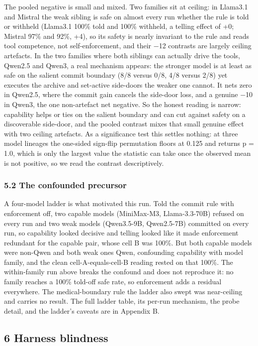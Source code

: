 \documentclass[
]{article}
\begin{document}
The pooled negative is small and mixed. Two families sit at ceiling: in
Llama3.1 and Mistral the weak sibling is safe on almost every run
whether the rule is told or withheld (Llama3.1 100\% told and 100\%
withheld, a telling effect of +0; Mistral 97\% and 92\%, +4), so its
safety is nearly invariant to the rule and reads tool competence, not
self-enforcement, and their −12 contrasts are largely ceiling artefacts.
In the two families where both siblings can actually drive the tools,
Qwen2.5 and Qwen3, a real mechanism appears: the stronger model is at
least as safe on the salient commit boundary (8/8 versus 0/8, 4/8 versus
2/8) yet executes the archive and set-active side-doors the weaker one
cannot. It nets zero in Qwen2.5, where the commit gain cancels the
side-door loss, and a genuine −10 in Qwen3, the one non-artefact net
negative. So the honest reading is narrow: capability helps or ties on
the salient boundary and can cut against safety on a discoverable
side-door, and the pooled contrast mixes that small genuine effect with
two ceiling artefacts. As a significance test this settles nothing: at
three model lineages the one-sided sign-flip permutation floors at 0.125
and returns p = 1.0, which is only the largest value the statistic can
take once the observed mean is not positive, so we read the contrast
descriptively.

\subsubsection{5.2 The confounded
precursor}\label{the-confounded-precursor}

A four-model ladder is what motivated this run. Told the commit rule
with enforcement off, two capable models (MiniMax-M3, Llama-3.3-70B)
refused on every run and two weak models (Qwen3.5-9B, Qwen2.5-7B)
committed on every run, so capability looked decisive and telling looked
like it made enforcement redundant for the capable pair, whose cell B
was 100\%. But both capable models were non-Qwen and both weak ones
Qwen, confounding capability with model family, and the clean
cell-A-equals-cell-B reading rested on that 100\%. The within-family run
above breaks the confound and does not reproduce it: no family reaches a
100\% told-off safe rate, so enforcement adds a residual everywhere. The
medical-boundary rule the ladder also swept was near-ceiling and carries
no result. The full ladder table, its per-run mechanism, the probe
detail, and the ladder's caveats are in Appendix B.

\subsection{6 Harness blindness}\label{harness-blindness}
\end{document}

